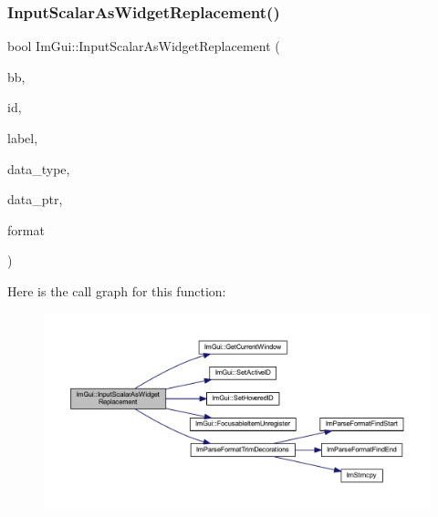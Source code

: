 \subsubsection{\texorpdfstring{Input\+Scalar\+As\+Widget\+Replacement()}{InputScalarAsWidgetReplacement()}}
{\footnotesize\ttfamily bool Im\+Gui\+::\+Input\+Scalar\+As\+Widget\+Replacement (\begin{DoxyParamCaption}\item[{const \mbox{\hyperlink{struct_im_rect}{Im\+Rect}} \&}]{bb,  }\item[{\mbox{\hyperlink{imgui_8h_a1785c9b6f4e16406764a85f32582236f}{Im\+Gui\+ID}}}]{id,  }\item[{const char $\ast$}]{label,  }\item[{\mbox{\hyperlink{imgui_8h_a4cfa8697a3d76722fff83eb18922e9d5}{Im\+Gui\+Data\+Type}}}]{data\+\_\+type,  }\item[{void $\ast$}]{data\+\_\+ptr,  }\item[{const char $\ast$}]{format }\end{DoxyParamCaption})}

Here is the call graph for this function\+:
\nopagebreak
\begin{figure}[H]
\begin{center}
\leavevmode
\includegraphics[width=350pt]{namespace_im_gui_ad724ab94c8aff2440c6a1b58ae7b2334_cgraph}
\end{center}
\end{figure}
\mbox{\label{namespace_im_gui_a885fc00fd3382f0aeb34c1140303c86a}} 
